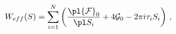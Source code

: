 \begin{equation}
W_{eff}(S)=\sum_{i=1}^{N}\left( \frac{\pl {\cal F}_{0}}{\pl S_{i}}+4{\cal G}%
_{0}-2\pi i\tau _{i}S_{i}\right) \,,  \label{EFF1}
\end{equation}

